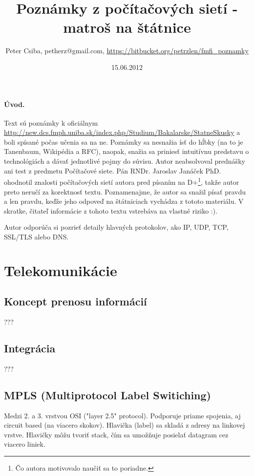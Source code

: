 \documentclass[10pt,a4paper]{article}
\title{Poznámky z počítačových sietí - matroš na štátnice}
\date{15.06.2012}
\author{Peter Csiba, petherz@gmail.com, \url{https://bitbucket.org/petrzlen/fmfi_poznamky}}
\begin{document}
\maketitle
\tableofcontents

\clearpage

\paragraph{Úvod.}   

Text sú poznámky k oficiálnym \href{štátnicovým otázkam}{http://new.dcs.fmph.uniba.sk/index.php/Studium/Bakalarske/StatneSkusky} a boli spísané počas učenia sa na ne.
Poznámky sa nesnažia ísť do hĺbky (na to je Tanenbaum, Wikipédia a RFC), naopak, snažia sa priniesť intuitívnu predstavu o technológiách a dávať jednotlivé pojmy do súvisu. 
Autor neabsolvoval prednášky ani test z predmetu Počítačové siete. Pán RNDr. Jaroslav Janáček PhD. ohodnotil znalosti počítačových sietí autora pred písaním na D+\footnote{
Čo autora motivovalo naučiť sa to poriadne. 
}, takže autor preto neručí za korektnosť textu.
Poznamenajme, že autor sa snažil písať pravdu a len pravdu, keďže jeho odpoveď na štátniciach vychádza z tototo materiálu. V skratke, čitateľ informácie z tohoto textu vstrebáva na vlastné riziko :).

Autor odporúča si pozrieť detaily hlavných protokolov, ako IP, UDP, TCP, SSL/TLS alebo DNS. 

\section{Telekomunikácie}           
\subsection{Koncept prenosu informácií} 
???

\subsection{Integrácia}
???
               
\subsection{MPLS (Multiprotocol Label Switiching)}
Medzi 2. a 3. vrstvou OSI ("layer 2.5" protocol). 
Podporuje priame spojenia, aj circuit based (na viacero skokov).
Hlavička (label) sa skladá z adresy na linkovej vrstve. Hlavičky môžu tvoriť stack, čím sa umožňuje posielať datagram cez viacero liniek.
\end{document}
